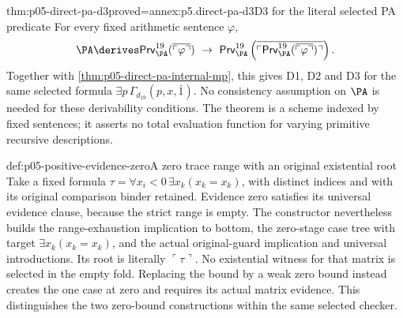 \begin{hbtheorem}{thm:p05-direct-pa-d3}{proved=annex:p5.direct-pa-d3}{D3 for the literal selected PA predicate}
For every fixed arithmetic sentence \(\varphi\),
\[
 \PA\derives
  \mathsf{Prv}^{19}_{\PA}(\overline{\ulcorner\varphi\urcorner})
   \ \to\
  \mathsf{Prv}^{19}_{\PA}
       \left(\overline{\ulcorner
          \mathsf{Prv}^{19}_{\PA}
                    (\overline{\ulcorner\varphi\urcorner})
                         \urcorner}\right).
\]
Together with \cref{thm:p05-direct-pa-internal-mp}, this gives D1,
D2 and D3 for the same selected formula
\(\exists p\,\Gamma_{d_{19}}(p,x,\bar1)\).
No consistency assumption on \(\PA\) is needed for these derivability
conditions. The theorem is a scheme indexed by fixed sentences; it asserts
no total evaluation function for varying primitive recursive descriptions.
\end{hbtheorem}

\begin{hbexample}{def:p05-positive-evidence-zero}{A zero trace range with an original existential root}
Take a fixed formula
\(\tau=\forall x_i<0\,\exists x_k(x_k=x_k)\), with distinct
indices and with its original comparison binder retained. Evidence zero
satisfies its universal evidence clause, because the strict range is empty.
The constructor nevertheless builds the range-exhaustion implication to
bottom, the zero-stage case tree with target
\(\exists x_k(x_k=x_k)\), and the actual original-guard implication
and universal introductions. Its root is literally
\(\ulcorner\tau\urcorner\). No existential witness for that matrix
is selected in the empty fold. Replacing the bound by a weak zero bound
instead creates the one case at zero and requires its actual matrix
evidence. This distinguishes the two zero-bound constructions within the
same selected checker.
\end{hbexample}
